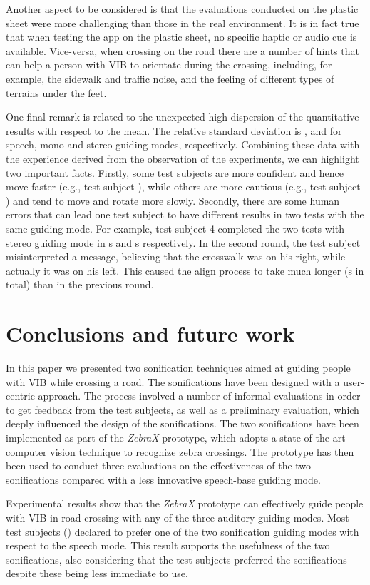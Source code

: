 \documentclass{article}
\newcommand{\zebra}{\emph{ZebraX}}
\begin{document}
Another aspect to be considered is that the evaluations conducted on the plastic sheet were more challenging than those in the real environment. It is in fact true that when testing the app on the plastic sheet, no specific haptic or audio cue is available. Vice-versa, when crossing on the road there are a number of hints that can help a person with VIB to orientate during the crossing, including, for example, the sidewalk and traffic noise, and the feeling of different types of terrains under the feet.

One final remark is related to the unexpected high dispersion of the quantitative results with respect to the mean. The relative standard deviation is ,  and  for speech, mono and stereo guiding modes, respectively.
Combining these data with the experience derived from the observation of the experiments, we can highlight two important facts.
Firstly, some test subjects are more confident and hence move faster (e.g., test subject ), while others are more cautious (e.g., test subject ) and tend to move and rotate more slowly.
Secondly, there are some human errors that can lead one test subject to have different results in two tests with the same guiding mode.
For example, test subject 4 completed the two tests with stereo guiding mode in s and s respectively. In the second round, the test subject misinterpreted a message, believing that the crosswalk was on his right, while actually it was on his left. This caused the align process to take much longer (s in total) than in the previous round.

\section{Conclusions and future work}
\label{sec:concl}
In this paper we presented two sonification techniques aimed at guiding people with VIB while crossing a road.
The sonifications have been designed with a user-centric approach. The process involved a number of informal evaluations in order to get feedback from the test subjects, as well as a preliminary evaluation, which deeply influenced the design of the sonifications.
The two sonifications have been implemented as part of the \zebra{} prototype, which adopts a state-of-the-art computer vision technique to recognize zebra crossings.
The prototype has then been used to conduct three evaluations on the effectiveness of the two sonifications compared with a less innovative speech-base guiding mode.

Experimental results show that the \zebra{} prototype can effectively guide people with VIB in road crossing with any of the three auditory guiding modes.
Most test subjects () declared to prefer one of the two sonification guiding modes with respect to the speech mode. This result supports the usefulness of the two sonifications, also considering that the test subjects preferred the sonifications despite these being less immediate to use.
\end{document}
